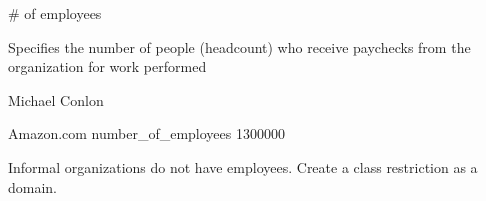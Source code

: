 \documentclass[letterpaper,10pt,english]{sphinxmanual}
\begin{document}
\begin{sphinxShadowBox}

\sphinxAtStartPar
\# of employees
\end{sphinxShadowBox}

\begin{sphinxShadowBox}

\sphinxAtStartPar
{}
\end{sphinxShadowBox}

\begin{sphinxShadowBox}

\sphinxAtStartPar
Specifies the number of people (headcount) who receive paychecks from the organization for work performed
\end{sphinxShadowBox}

\begin{sphinxShadowBox}

\sphinxAtStartPar
Michael Conlon 
\end{sphinxShadowBox}

\begin{sphinxShadowBox}

\sphinxAtStartPar
{\hyperref[\detokenize{doc-ORG_0000001::doc}]{}}
\end{sphinxShadowBox}

\begin{sphinxShadowBox}

\sphinxAtStartPar
{}
\end{sphinxShadowBox}

\begin{sphinxShadowBox}

\sphinxAtStartPar
Amazon.com number\_of\_employees 1300000
\end{sphinxShadowBox}

\begin{sphinxShadowBox}

\sphinxAtStartPar
Informal organizations do not have employees.  Create a class restriction as a domain.
\end{sphinxShadowBox}
\end{document}

